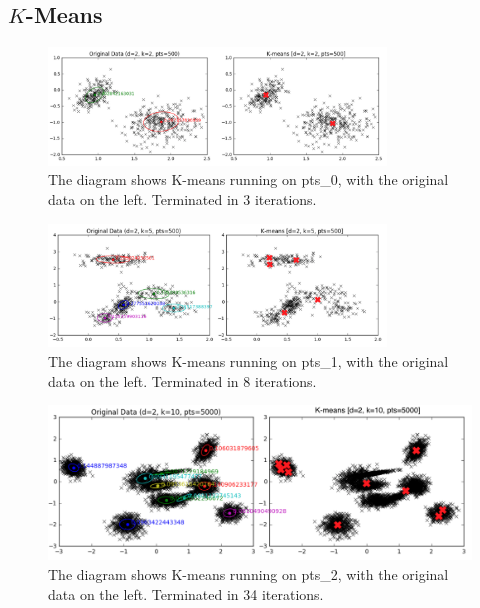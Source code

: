 \documentclass[11pt,openright,a4paper]{article}
\numberwithin{equation}{section}
\begin{document}
\subsection{$K$-Means} \label{sec:results-km}

\begin{figure}[H]
  \centering
  \includegraphics[width=0.8\textwidth]{screen-km-2-2-500}
    \caption{The diagram shows K-means running on pts\_0, with the original data on the left. Terminated in 3 iterations.}
  \label{fig:screen-ori-data}
\end{figure} 

\begin{figure}[H]
  \centering
  \includegraphics[width=0.8\textwidth]{screen-km-2-5-500}
    \caption{The diagram shows K-means running on pts\_1, with the original data on the left. Terminated in 8 iterations.}
  \label{fig:screen-screen-km-2-5-500}
\end{figure} 

\begin{figure}[H]
  \centering
  \includegraphics[width=1\textwidth]{screen-km-2-10-5000}
    \caption{The diagram shows K-means running on pts\_2, with the original data on the left. Terminated in 34 iterations.}
  \label{fig:screen-km-2-10-5000}
\end{figure} 
\end{document}
